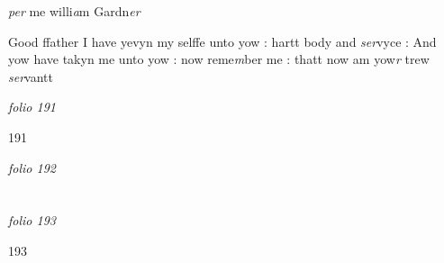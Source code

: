 \documentclass[12pt, a4paper]{book}
\begin{document}
      				
      					
		\ifthenelse{\isodd{\thepage}}
		{\reversemarginpar}
		{\normalmarginpar}
		\textit{per }me willi\textit{a}m Gardn\textit{er}
      				
      				
      					
		\ifthenelse{\isodd{\thepage}}
		{\reversemarginpar}
		{\normalmarginpar}
		Good ffather I have yevyn my selffe unto yow : hartt body and \textit{ser}vyce : And yow have takyn me unto yow : now reme\textit{m}ber me : thatt now am yow\textit{r} trew \textit{ser}vantt
      				
      				
\dotfill
						\newpage
{}

\textit{folio 191}
      		
      		
      		\begin{flushright}{\color{Mahogany}191}\end{flushright}
      		
\dotfill
						\newpage
{}

\textit{folio 192}
      		
      		
      		\vspace*{4cm}
      		
\dotfill
						  \section*{}  \subsection*{}

\textit{folio 193}
      				
      				
      				
      				\begin{flushright}{\color{Mahogany}193}\end{flushright}
      				
\end{document}
